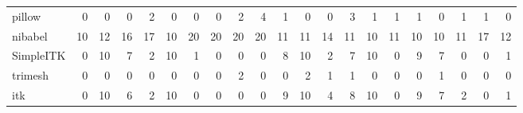 \begin{tabular}{lrrrrrrrrrrrrrrrrrrrr}
pillow & 0 & 0 & 0 & 2 & 0 & 0 & 0 & 2 & 4 & 1 & 0 & 0 & 3 & 1 & 1 & 1 & 0 & 1 & 1 & 0 \\
nibabel & 10 & 12 & 16 & 17 & 10 & 20 & 20 & 20 & 20 & 11 & 11 & 14 & 11 & 10 & 11 & 10 & 10 & 11 & 17 & 12 \\
SimpleITK & 0 & 10 & 7 & 2 & 10 & 1 & 0 & 0 & 0 & 8 & 10 & 2 & 7 & 10 & 0 & 9 & 7 & 0 & 0 & 1 \\
trimesh & 0 & 0 & 0 & 0 & 0 & 0 & 0 & 2 & 0 & 0 & 2 & 1 & 1 & 0 & 0 & 0 & 1 & 0 & 0 & 0 \\
itk & 0 & 10 & 6 & 2 & 10 & 0 & 0 & 0 & 0 & 9 & 10 & 4 & 8 & 10 & 0 & 9 & 7 & 2 & 0 & 1 \\
\bottomrule
\end{tabular}
